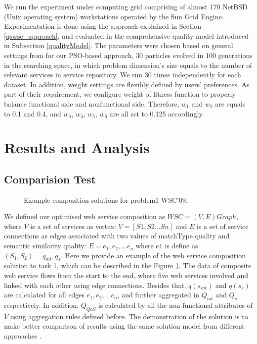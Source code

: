 \documentclass{llncs}
\begin{document}
We run the experiment under computing grid comprising of almost 170 NetBSD (Unix operating system) workstations operated by the Sun Grid Engine. Experimentation is done using the approach explained in Section \ref{qswsc_approach}, and evaluated in the comprehensive quality model introduced in Subsection \ref{qualityModel}. The parameters were chosen based on general settings from \cite{shi2001particle} for our PSO-based approach, 30 particles evolved in 100 generations in the searching space, in which problem dimension's size equals to the number of relevant services in service repository. We run 30 times independently for each dataset. In addition, weight settings are flexibly defined by users' preferences. As part of their requirement, we configure weight of fitness function to properly balance functional side and nonfunctional side. Therefore, $w_{1}$ and $w_{2}$ are equals to 0.1 and 0.4,  and $w_{3}$, $w_{4}$, $w_{5}$, $w_{6}$ are all set to 0.125 accordingly.

\section{Results and Analysis}\label{results_analysis}
\subsection{Comparision Test}\label{comparisionTest}
\begin{figure}[h]
\centerline{
}
 \caption{Example composition solutions for problem1 WSC'09.}
 \label{wscs}
\end{figure}
We defined our optimised web service composition as $WSC = (V, E)Graph$, where $V$ is a set of services as vertex: $V=[S1, S2...Sn]$ and $E$ is a set of service connections as edges associated with two values of matchType quality and semantic similarity quality: $E = {e_{1}, e_{2},... e_{n}}$ where $e1$ is define as $(S_{1},S_{2})={q_{mt}, q_{s}}$. Here we provide an example of the web service composition solution to task 1, which can be described in the Figure \ref{wscs}. The data of composite web service flows from the start to the end, where five web services involved and linked with each other using edge connections. Besides that, $q(s_{mt})$ and $q(s_{s})$ are calculated for all edges ${e_{1}, e_{2},... e_{n}}$, and further aggregated in $Q_{mt}$ and $Q_{s}$ respectively. In addition, $Q_{QoS}$ is calculated by all the non-functional attributes of $V$ using aggregation rules defined before. The demonstration of the solution is to make better comparison of results using the same solution model from different approaches .
\end{document}
